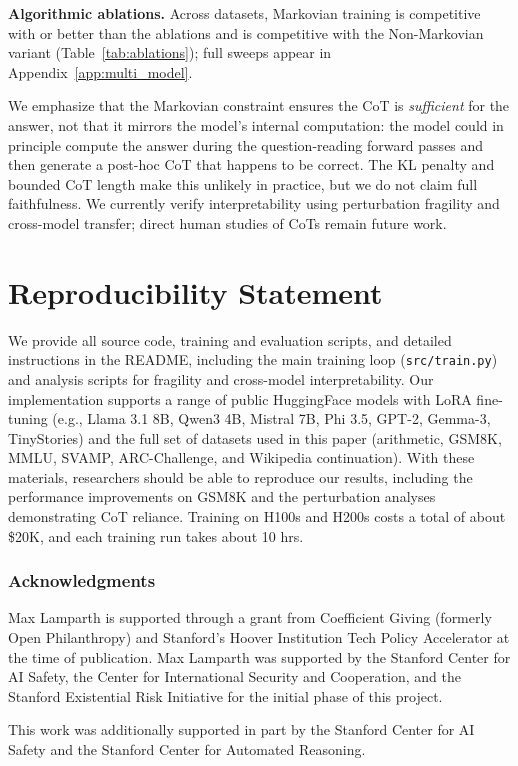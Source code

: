 \documentclass{article} %
\begin{document}
\textbf{Algorithmic ablations.} Across datasets, Markovian training is competitive with or better than the ablations and is competitive with the Non-Markovian variant (Table~\ref{tab:ablations}); full sweeps appear in Appendix~\ref{app:multi_model}.

We emphasize that the Markovian constraint ensures the CoT is \emph{sufficient} for the answer, not that it mirrors the model's internal computation: the model could in principle compute the answer during the question-reading forward passes and then generate a post-hoc CoT that happens to be correct. The KL penalty and bounded CoT length make this unlikely in practice, but we do not claim full faithfulness. We currently verify interpretability using perturbation fragility and cross-model transfer; direct human studies of CoTs remain future work.


\section{Reproducibility Statement}
We provide all source code, training and evaluation scripts, and detailed instructions in the README, including the main training loop (\texttt{src/train.py}) and analysis scripts for fragility and cross-model interpretability. Our implementation supports a range of public HuggingFace models with LoRA fine-tuning (e.g., Llama 3.1 8B, Qwen3 4B, Mistral 7B, Phi 3.5, GPT-2, Gemma-3, TinyStories) and the full set of datasets used in this paper (arithmetic, GSM8K, MMLU, SVAMP, ARC-Challenge, and Wikipedia continuation). With these materials, researchers should be able to reproduce our results, including the performance improvements on GSM8K and the perturbation analyses demonstrating CoT reliance. Training on H100s and H200s costs a total of about \$20K, and each training run takes about 10 hrs.


\subsubsection*{Acknowledgments}
Max Lamparth is supported through a grant from Coefficient Giving (formerly Open Philanthropy) and Stanford's Hoover Institution Tech Policy Accelerator at the time of publication. Max Lamparth was supported by the Stanford Center for AI Safety, the Center for International Security and Cooperation, and the Stanford Existential Risk Initiative for the initial phase of this project.


This work was additionally supported in part by the Stanford Center for AI Safety and the Stanford Center for Automated Reasoning.


\end{document}
